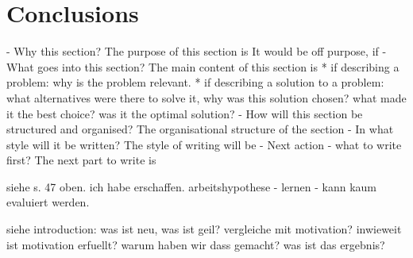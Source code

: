 \chapter{Conclusions}

- Why this section? 
  The purpose of this section is 
  It would be off purpose, if 
- What goes into this section?
  The main content of this section is 
  * if describing a problem: why is the problem relevant.
  * if describing a solution to a problem: what alternatives were
    there to solve it, why was this solution chosen? 
    what made it the best choice? was it the optimal solution?
- How will this section be structured and organised?
  The organisational structure of the section 
- In what style will it be written?
  The style of writing will be 
- Next action - what to write first?
  The next part to write is


siehe s. 47 oben.
ich habe erschaffen.
arbeitshypothese - lernen - kann kaum evaluiert werden.

siehe introduction:
was ist neu, was ist geil?
vergleiche mit motivation?
inwieweit ist motivation erfuellt?
warum haben wir dass gemacht? was ist das ergebnis?
